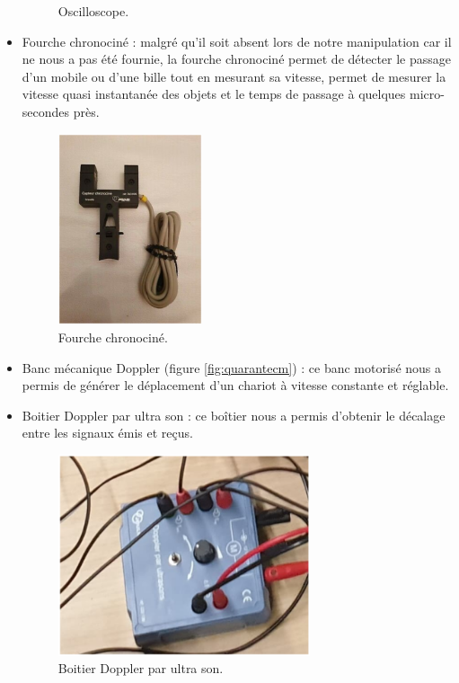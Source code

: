 \documentclass[a4paper]{article}
\begin{document}
\begin{itemize}
\begin{figure}[H]
    \caption{Oscilloscope.}
    \label{fig:oscilloscope}
  \end{figure}
  \item Fourche chronociné : malgré qu’il soit absent lors de notre manipulation car il ne nous a pas été fournie, la fourche chronociné permet de détecter le passage d'un mobile ou d'une bille tout en mesurant sa vitesse, permet de mesurer la vitesse quasi instantanée des objets et le temps de passage à quelques micro-secondes près.
  \begin{figure}[H]
    \centering
    \includegraphics[width=0.4\textwidth, angle=90]{fourche-chronocine1.PNG}
    \caption{Fourche chronociné.}
    \label{fig:fourcheChronocine}
  \end{figure}
  \item Banc mécanique Doppler (figure \ref{fig:quarantecm}) : ce banc motorisé nous a permis de générer le déplacement d'un chariot à vitesse constante et réglable.
  \item Boitier Doppler par ultra son : ce boîtier nous a permis d'obtenir le décalage entre les signaux émis et reçus.
  \begin{figure}[H]
    \centering
    \includegraphics[width=0.7\textwidth]{boitier-doppler.PNG}
    \caption{Boitier Doppler par ultra son.}
    \label{fig:boitierDoppler}
  \end{figure}
\end{itemize}
\end{document}
